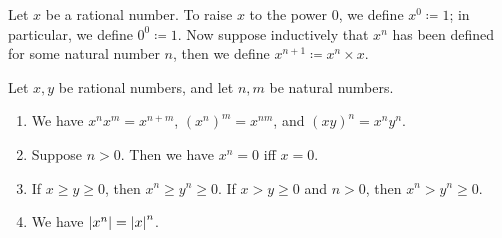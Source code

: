 \begin{defn}\label{i:4.3.9}
  Let \(x\) be a rational number.
  To raise \(x\) to the power \(0\), we define \(x^0 \coloneqq 1\);
  in particular, we define \(0^0 \coloneqq 1\).
  Now suppose inductively that \(x^n\) has been defined for some natural number \(n\), then we define \(x^{n+1} \coloneqq x^n \times x\).
\end{defn}

\begin{prop}\label{i:4.3.10}
  Let \(x, y\) be rational numbers, and let \(n, m\) be natural numbers.
  \begin{enumerate}
    \item We have \(x^n x^m = x^{n + m}\), \((x^n)^m = x^{nm}\), and \((xy)^n = x^n y^n\).
    \item Suppose \(n > 0\).
          Then we have \(x^n = 0\) iff \(x = 0\).
    \item If \(x \geq y \geq 0\), then \(x^n \geq y^n \geq 0\).
          If \(x > y \geq 0\) and \(n > 0\), then \(x^n > y^n \geq 0\).
    \item We have \(\left\lvert x^n\right\rvert = \left\lvert x\right\rvert^n\).
  \end{enumerate}
\end{prop}

